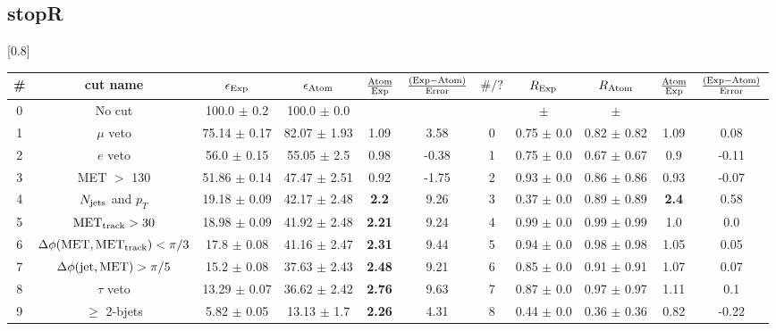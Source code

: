 \documentclass[12pt]{article}
\begin{document}
\subsection*{ stopR }




\renewcommand{\arraystretch}{1.3}
\begin{table}[h!]
\begin{center}
\scalebox{0.7}[0.8]{ 
\begin{tabular}{c|c||c|c|>{\columncolor{yellow}}c|c||c|c|c|>{\columncolor{yellow}}c|c}
\hline
\# & cut name & $\epsilon_{\rm Exp}$ & $\epsilon_{\rm Atom}$ & $\frac{\rm Atom}{\rm Exp}$ & $\frac{({\rm Exp} - {\rm Atom})}{\rm Error}$ & $\#/?$ & $R_{\rm Exp}$ & $R_{\rm Atom}$ & $\frac{\rm Atom}{\rm Exp}$ & $\frac{({\rm Exp} - {\rm Atom})}{\rm Error}$ \\
\hline
0 & No cut & 100.0 $\pm$ 0.2 & 100.0 $\pm$ 0.0 &  &  &  &  $\pm$  &  $\pm$  &  &  \\
1 & $\mu$ veto & 75.14 $\pm$ 0.17 & 82.07 $\pm$ 1.93 & 1.09 & 3.58 & 0 & 0.75 $\pm$ 0.0 & 0.82 $\pm$ 0.82 & 1.09 & 0.08 \\
2 & $e$ veto & 56.0 $\pm$ 0.15 & 55.05 $\pm$ 2.5 & 0.98 & -0.38 & 1 & 0.75 $\pm$ 0.0 & 0.67 $\pm$ 0.67 & 0.9 & -0.11 \\
3 & MET $>$ 130 & 51.86 $\pm$ 0.14 & 47.47 $\pm$ 2.51 & 0.92 & -1.75 & 2 & 0.93 $\pm$ 0.0 & 0.86 $\pm$ 0.86 & 0.93 & -0.07 \\
4 & \cellcolor{cyan} $N_{\rm jets}$ and $p_T$ & 19.18 $\pm$ 0.09 & 42.17 $\pm$ 2.48 & \color{red}\bf 2.2 & 9.26 & 3 & 0.37 $\pm$ 0.0 & 0.89 $\pm$ 0.89 & \color{blue}\bf 2.4 & 0.58 \\
5 & $\rm MET_{track} > 30$ & 18.98 $\pm$ 0.09 & 41.92 $\pm$ 2.48 & \color{red}\bf 2.21 & 9.24 & 4 & 0.99 $\pm$ 0.0 & 0.99 $\pm$ 0.99 & 1.0 & 0.0 \\
6 & $\Delta \phi (\rm MET, MET_{track}) < \pi/3$ & 17.8 $\pm$ 0.08 & 41.16 $\pm$ 2.47 & \color{red}\bf 2.31 & 9.44 & 5 & 0.94 $\pm$ 0.0 & 0.98 $\pm$ 0.98 & 1.05 & 0.05 \\
7 & $\Delta \phi (\rm jet, MET) > \pi/5$ & 15.2 $\pm$ 0.08 & 37.63 $\pm$ 2.43 & \color{red}\bf 2.48 & 9.21 & 6 & 0.85 $\pm$ 0.0 & 0.91 $\pm$ 0.91 & 1.07 & 0.07 \\
8 & $\tau$ veto & 13.29 $\pm$ 0.07 & 36.62 $\pm$ 2.42 & \color{red}\bf 2.76 & 9.63 & 7 & 0.87 $\pm$ 0.0 & 0.97 $\pm$ 0.97 & 1.11 & 0.1 \\
9 & $\ge$ 2-bjets & 5.82 $\pm$ 0.05 & 13.13 $\pm$ 1.7 & \color{red}\bf 2.26 & 4.31 & 8 & 0.44 $\pm$ 0.0 & 0.36 $\pm$ 0.36 & 0.82 & -0.22 \\

\end{tabular}}
\end{center}
\end{table}
\end{document}

